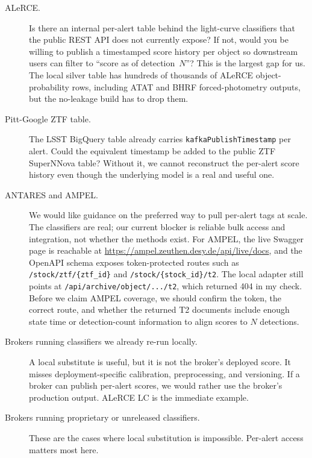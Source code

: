 \documentclass[11pt]{article}
\newcommand{\code}[1]{\texttt{#1}}
\begin{document}
\begin{description}
\item[ALeRCE.] Is there an internal per-alert table behind the
  light-curve classifiers that the public REST API does not currently
  expose? If not, would you be willing to publish a timestamped score
  history per object so downstream users can filter to ``score as of
  detection~$N$''? This is the largest gap for us. The local silver table
  has hundreds of thousands of ALeRCE object-probability rows, including
  ATAT and BHRF forced-photometry outputs, but the no-leakage build has
  to drop them.

\item[Pitt-Google ZTF table.] The LSST BigQuery table already carries
  \code{kafkaPublishTimestamp} per alert. Could the equivalent timestamp
  be added to the public ZTF SuperNNova table? Without it, we cannot
  reconstruct the per-alert score history even though the underlying
  model is a real and useful one.

\item[ANTARES and AMPEL.] We would like guidance on the preferred way to
  pull per-alert tags at scale. The classifiers are real; our current
  blocker is reliable bulk access and integration, not whether the
  methods exist. For AMPEL, the live Swagger page is reachable at
  \url{https://ampel.zeuthen.desy.de/api/live/docs}, and the OpenAPI
  schema exposes token-protected routes such as
  \code{/stock/ztf/\{ztf\_id\}} and \code{/stock/\{stock\_id\}/t2}.
  The local adapter still points at \code{/api/archive/object/.../t2},
  which returned 404 in my check. Before we claim AMPEL coverage, we
  should confirm the token, the correct route, and whether the returned
  T2 documents include enough state time or detection-count information
  to align scores to $N$ detections.

\item[Brokers running classifiers we already re-run locally.] A local
  substitute is useful, but it is not the broker's deployed score. It
  misses deployment-specific calibration, preprocessing, and versioning.
  If a broker can publish per-alert scores, we would rather use the
  broker's production output. ALeRCE LC is the immediate example.

\item[Brokers running proprietary or unreleased classifiers.] These are
  the cases where local substitution is impossible. Per-alert access
  matters most here.
\end{description}
\end{document}
